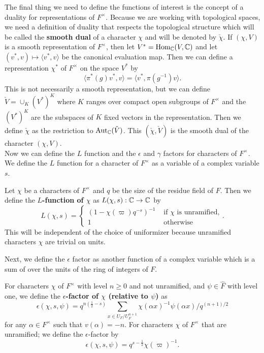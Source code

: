 The final thing we need to define the functions of interest is the concept of a duality for representations of $F^\times$.
Because we are working with topological spaces, we need a definition of duality that respects the topological structure which will be called the \textbf{smooth dual} of a character $\chi$ and will be denoted by $\check{\chi}$.
If $(\chi, V)$ is a smooth representation of $F^\times$, then let $V^* = \textrm{Hom}_{\mathbb{C}}(V,\mathbb{C})$ and let $(v^* , v) \mapsto \langle v^*, v\rangle$ be the canonical evaluation map.
Then we can define a representation $\chi^*$ of $F^\times$ on the space $V^*$ by
\[\langle \pi^*(g)v^*, v\rangle = \langle v^* , \pi(g^{-1})v\rangle.\]
This is not necessarily a smooth representation, but we can define $\check{V} = \cup_K (V^*)^K$ where $K$ ranges over compact open subgroups of $F^\times$ and the $(V^*)^K$ are the subspaces of $K$ fixed vectors in the representation.
Then we define $\check{\chi}$ as the restriction to $\textrm{Aut}_{\mathbb{C}}(\check{V})$.
This $(\check{\chi},\check{V})$ is the smooth dual of the character $(\chi, V)$.
\\

Now we can define the $L$ function and the  $\epsilon$ and $\gamma$ factors for characters of $F^\times$.
We define the $L$ function for a character of $F^\times$ as a variable of a complex variable $s$.

\begin{defn}
  Let $\chi$ be a characters of $F^\times$ and $q$ be the size of the residue field of $F$. Then we define the \textbf{$L$-function of $\chi$} as $L(\chi, s) : \mathbb{C} \to \mathbb{C}$ by 
  \[L(\chi, s) = \begin{cases} (1 - \chi(\varpi) q^{-s})^{-1} & \text{ if } \chi \text{ is unramified,} \\ 1 & \text{ otherwise} \end{cases}.\]
  This will be independent of the choice of uniformizer because unramified characters $\chi$ are trivial on units.
\end{defn}

Next, we define the $\epsilon$ factor as another function of a complex variable which is a sum of over the units of the ring of integers of $F$.
\begin{defn}
  For characters $\chi$ of $F^\times$ with level $n \geq 0$ and not unramified, and $\psi \in \hat{F}$ with level one, we define the \textbf{$\epsilon$-factor of $\chi$ (relative to $\psi$)} as
  \[\epsilon(\chi, s, \psi) = q^{n(\frac{1}{2} - s)} \sum_{x \in U_F/U_F^{n+1}} \chi(\alpha x)^{-1} \psi(\alpha x)/q^{(n+1)/2}\]
  for any $\alpha \in F^\times$ such that $v(\alpha) = -n$.
  For characters $\chi$ of $F^\times$ that are unramified; we define the $\epsilon$-factor by
  \[\epsilon(\chi, s, \psi) = q^{s - \frac{1}{2}} \chi(\varpi)^{-1}.\]
\end{defn}

